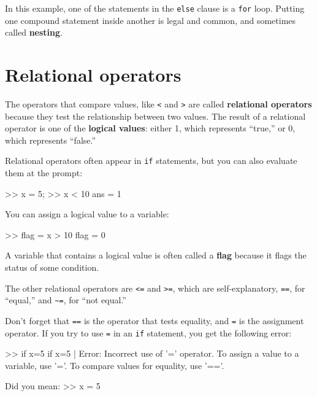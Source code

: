 \documentclass[
]{book}
\numberwithin{Answer}{chapter}
\numberwithin{Exercise}{chapter}
\begin{document}
In this example, one of the statements in the {\tt else} clause is a
{\tt for} loop.  Putting one compound statement inside another is
legal and common, and sometimes called {\bf nesting}.



\section{Relational operators}

The operators that compare values, like {\tt <} and {\tt >} are
called {\bf relational operators} because they test the relationship
between two values.  The result of a relational operator is one
of the {\bf logical values}:
either 1, which represents ``true,''  or 0, which represents ``false.''


Relational operators often appear in {\tt if} statements, but you can also evaluate them at the prompt:

\begin{code}
>> x = 5;
>> x < 10
ans = 1
\end{code}

You can assign a logical value to a variable:

\begin{code}
>> flag = x > 10
flag = 0
\end{code}

A variable that contains a logical value is often called a {\bf flag}
because it flags the status of some condition.


The other relational operators are {\tt <=} and {\tt >=}, which are
self-explanatory, {\tt ==}, for ``equal,'' and
\verb+~=+, for ``not equal.''

Don't forget that {\tt ==} is the operator that tests equality,
and {\tt =} is the assignment operator.  If you try to use {\tt =} in
an {\tt if} statement, you get the following error:


\begin{code}
>> if x=5
 if x=5
     |
Error: Incorrect use of '=' operator. 
To assign a value to a variable, use '='.
To compare values for equality, use '=='.
 
Did you mean:
>> x = 5
\end{code}
\end{document}
